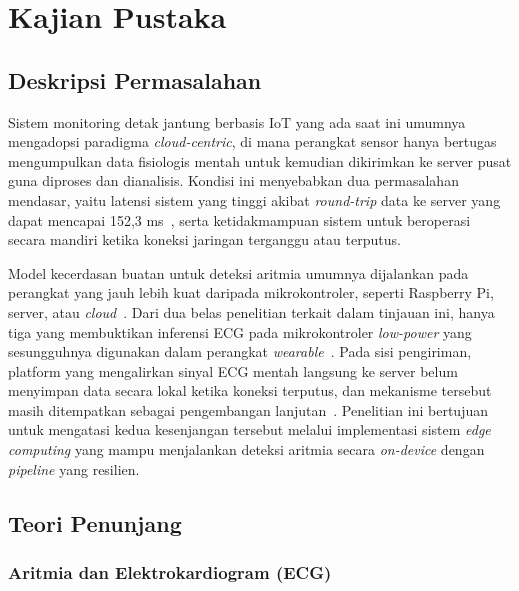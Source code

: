 \chapter{Kajian Pustaka}

\section{Deskripsi Permasalahan}

Sistem monitoring detak jantung berbasis IoT yang ada saat ini umumnya mengadopsi paradigma \textit{cloud-centric}, di mana perangkat sensor hanya bertugas mengumpulkan data fisiologis mentah untuk kemudian dikirimkan ke server pusat guna diproses dan dianalisis. Kondisi ini menyebabkan dua permasalahan mendasar, yaitu latensi sistem yang tinggi akibat \textit{round-trip} data ke server yang dapat mencapai 152,3 ms~\cite{al_quayed_2026}, serta ketidakmampuan sistem untuk beroperasi secara mandiri ketika koneksi jaringan terganggu atau terputus.

Model kecerdasan buatan untuk deteksi aritmia umumnya dijalankan pada perangkat yang jauh lebih kuat daripada mikrokontroler, seperti Raspberry Pi, server, atau \textit{cloud}~\cite{karri_2023, mekhfioui_2025, xie_2021, mulyawan_2026}. Dari dua belas penelitian terkait dalam tinjauan ini, hanya tiga yang membuktikan inferensi ECG pada mikrokontroler \textit{low-power} yang sesungguhnya digunakan dalam perangkat \textit{wearable}~\cite{kim_2023, zambrano_2026, sheeba_rani_2026}. Pada sisi pengiriman, platform yang mengalirkan sinyal ECG mentah langsung ke server belum menyimpan data secara lokal ketika koneksi terputus, dan mekanisme tersebut masih ditempatkan sebagai pengembangan lanjutan~\cite{escobedo_2026}. Penelitian ini bertujuan untuk mengatasi kedua kesenjangan tersebut melalui implementasi sistem \textit{edge computing} yang mampu menjalankan deteksi aritmia secara \textit{on-device} dengan \textit{pipeline} yang resilien.

\section{Teori Penunjang}

\subsection{Aritmia dan Elektrokardiogram (ECG)}

